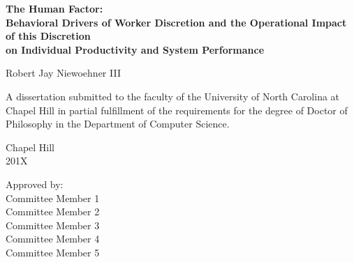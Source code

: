 \begin{titlepage}
\begin{center}


\vspace{2in}
\begin{singlespace}
\bf
The Human Factor:\\
Behavioral Drivers of Worker Discretion and the Operational Impact of this Discretion\\
on Individual Productivity and System Performance
\end{singlespace}


\vspace{61pt} %
\large Robert Jay Niewoehner III
\end{center}



\vspace{50pt}
\begin{singlespace}
\noindent \large
A dissertation submitted to the faculty of the University of North Carolina at Chapel Hill
in partial fulfillment of the requirements for the degree of Doctor of Philosophy in
the Department of Computer Science.
\end{singlespace}


\vspace{50pt}
\begin{center}
\begin{singlespace} \large
Chapel Hill\\
201X
\end{singlespace}
\end{center}


\vfill
\begin{flushright}
\begin{minipage}[t]{1.5in} \large
Approved by:\\
Committee Member 1 \\
Committee Member 2 \\
Committee Member 3 \\
Committee Member 4 \\
Committee Member 5
\end{minipage}
\end{flushright}

\end{titlepage}
